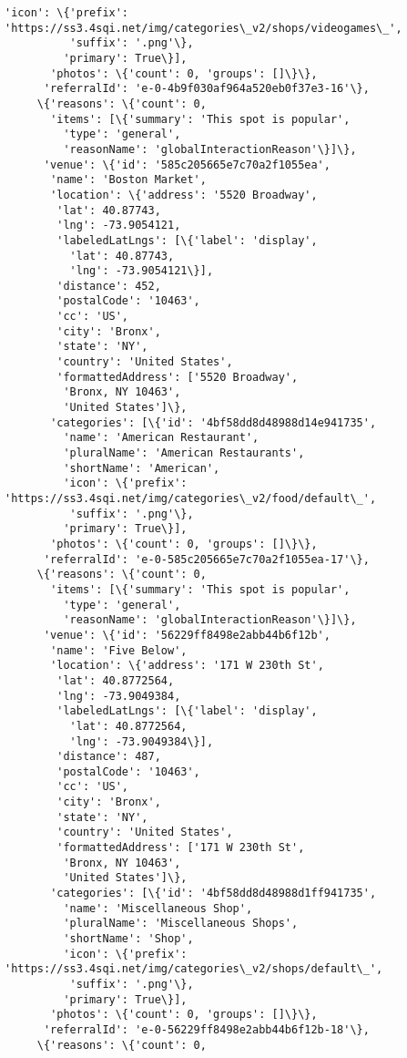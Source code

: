 \documentclass[11pt]{article}
\begin{document}
\begin{tcolorbox}[breakable, size=fbox, boxrule=.5pt, pad at break*=1mm, opacityfill=0]
\begin{Verbatim}[commandchars=\\\{\}]
         'icon': \{'prefix':
'https://ss3.4sqi.net/img/categories\_v2/shops/videogames\_',
          'suffix': '.png'\},
         'primary': True\}],
       'photos': \{'count': 0, 'groups': []\}\},
      'referralId': 'e-0-4b9f030af964a520eb0f37e3-16'\},
     \{'reasons': \{'count': 0,
       'items': [\{'summary': 'This spot is popular',
         'type': 'general',
         'reasonName': 'globalInteractionReason'\}]\},
      'venue': \{'id': '585c205665e7c70a2f1055ea',
       'name': 'Boston Market',
       'location': \{'address': '5520 Broadway',
        'lat': 40.87743,
        'lng': -73.9054121,
        'labeledLatLngs': [\{'label': 'display',
          'lat': 40.87743,
          'lng': -73.9054121\}],
        'distance': 452,
        'postalCode': '10463',
        'cc': 'US',
        'city': 'Bronx',
        'state': 'NY',
        'country': 'United States',
        'formattedAddress': ['5520 Broadway',
         'Bronx, NY 10463',
         'United States']\},
       'categories': [\{'id': '4bf58dd8d48988d14e941735',
         'name': 'American Restaurant',
         'pluralName': 'American Restaurants',
         'shortName': 'American',
         'icon': \{'prefix':
'https://ss3.4sqi.net/img/categories\_v2/food/default\_',
          'suffix': '.png'\},
         'primary': True\}],
       'photos': \{'count': 0, 'groups': []\}\},
      'referralId': 'e-0-585c205665e7c70a2f1055ea-17'\},
     \{'reasons': \{'count': 0,
       'items': [\{'summary': 'This spot is popular',
         'type': 'general',
         'reasonName': 'globalInteractionReason'\}]\},
      'venue': \{'id': '56229ff8498e2abb44b6f12b',
       'name': 'Five Below',
       'location': \{'address': '171 W 230th St',
        'lat': 40.8772564,
        'lng': -73.9049384,
        'labeledLatLngs': [\{'label': 'display',
          'lat': 40.8772564,
          'lng': -73.9049384\}],
        'distance': 487,
        'postalCode': '10463',
        'cc': 'US',
        'city': 'Bronx',
        'state': 'NY',
        'country': 'United States',
        'formattedAddress': ['171 W 230th St',
         'Bronx, NY 10463',
         'United States']\},
       'categories': [\{'id': '4bf58dd8d48988d1ff941735',
         'name': 'Miscellaneous Shop',
         'pluralName': 'Miscellaneous Shops',
         'shortName': 'Shop',
         'icon': \{'prefix':
'https://ss3.4sqi.net/img/categories\_v2/shops/default\_',
          'suffix': '.png'\},
         'primary': True\}],
       'photos': \{'count': 0, 'groups': []\}\},
      'referralId': 'e-0-56229ff8498e2abb44b6f12b-18'\},
     \{'reasons': \{'count': 0,

\end{Verbatim}
\end{tcolorbox}
\end{document}
